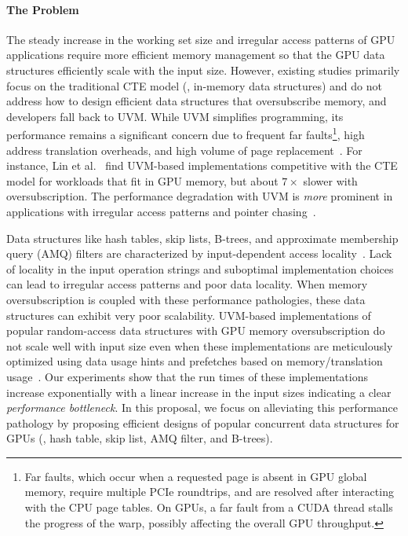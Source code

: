\documentclass[12pt,a4paper]{article}
\begin{document}
\paragraph*{The Problem}

The steady increase in the working set size and irregular access patterns of GPU applications require more efficient memory management so that the GPU data structures efficiently scale with the input size. However, existing studies primarily focus on the traditional CTE model (\ie, in-memory data structures) and do not address how to design efficient data structures that oversubscribe memory, and developers fall back to UVM. While UVM simplifies programming, its performance remains a significant concern due to frequent far faults\footnote{Far faults, which occur when a requested page is absent in GPU global memory, require multiple PCIe roundtrips, and are resolved after interacting with the CPU page tables. On \NVIDIA GPUs, a far fault from a CUDA thread stalls the progress of the warp, possibly affecting the overall GPU throughput.},
high address translation overheads, and high volume of page replacement~\cite{suv-micro-2024,in-depth-analysis-uvm-sc21,fine-grain-quantitative-uvm-taco24,batch-aware-asplos-2020,uvmsmart-isca-2019,cppe-ipdps-2020,irregular-page-walks-isca-2018,heterogeneous-uvm,uvm-forest-isca25,dynamap,uvmbench-arxiv}. For instance, Lin et al.~\cite{oversubscription-dl-training} find UVM-based implementations competitive with the CTE model for workloads that fit in GPU memory, but about $7\times$ slower with oversubscription. The performance degradation with UVM is \emph{more} prominent in applications with irregular access patterns and pointer chasing~\cite{fine-grain-quantitative-uvm-taco24,demystifying-uvm-cost-ipdps2021,in-depth-analysis-uvm-sc21}.

Data structures like hash tables, skip lists, B-trees, and approximate membership query (AMQ) filters are characterized by input-dependent access locality~\cite{art-of-multiprocessor-programming-v2}.
Lack of locality in the input operation strings and suboptimal implementation
choices can lead to irregular access patterns and poor data locality. When
memory oversubscription is coupled with these performance pathologies, these
data structures can exhibit very poor scalability. UVM-based
implementations of popular random-access data structures with GPU memory
oversubscription do not scale well with input size even when these
implementations are meticulously optimized using data usage hints and prefetches
based on memory/translation usage~\cite{nvidia-prefetching}. Our experiments
show that the run times of these implementations increase exponentially with a
linear increase in the input sizes indicating a clear \emph{performance
  bottleneck}. In this proposal, we focus on alleviating this performance
pathology by proposing efficient designs of popular concurrent data structures
for GPUs (\eg, hash table, skip list, AMQ filter, and B-trees).
\end{document}
